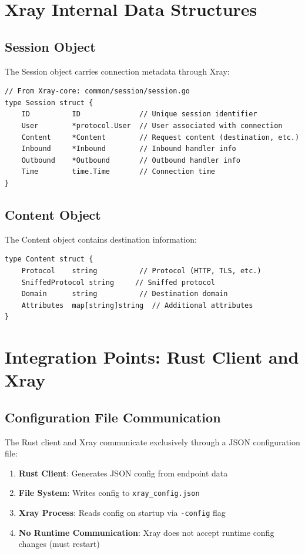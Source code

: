 \section{Xray Internal Data Structures}

\subsection{Session Object}

The Session object carries connection metadata through Xray:

\begin{verbatim}
// From Xray-core: common/session/session.go
type Session struct {
    ID          ID              // Unique session identifier
    User        *protocol.User  // User associated with connection
    Content     *Content        // Request content (destination, etc.)
    Inbound     *Inbound        // Inbound handler info
    Outbound    *Outbound       // Outbound handler info
    Time        time.Time       // Connection time
}
\end{verbatim}

\subsection{Content Object}

The Content object contains destination information:

\begin{verbatim}
type Content struct {
    Protocol    string          // Protocol (HTTP, TLS, etc.)
    SniffedProtocol string     // Sniffed protocol
    Domain      string          // Destination domain
    Attributes  map[string]string  // Additional attributes
}
\end{verbatim}

\section{Integration Points: Rust Client and Xray}

\subsection{Configuration File Communication}

The Rust client and Xray communicate exclusively through a JSON configuration file:

\begin{enumerate}
    \item \textbf{Rust Client}: Generates JSON config from endpoint data
    \item \textbf{File System}: Writes config to \texttt{xray\_config.json}
    \item \textbf{Xray Process}: Reads config on startup via \texttt{-config} flag
    \item \textbf{No Runtime Communication}: Xray does not accept runtime config changes (must restart)
\end{enumerate}

